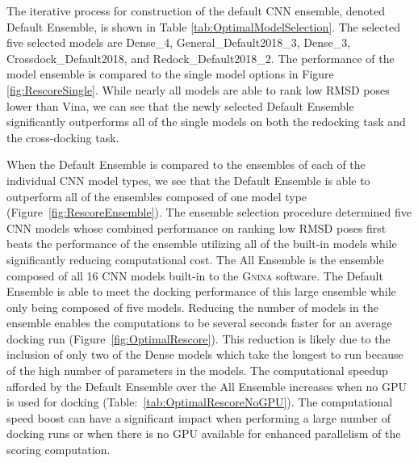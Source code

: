 \documentclass[journal=jcisd8,manuscript=article]{achemso}
\begin{document}
The iterative process for construction of the default CNN ensemble, denoted Default Ensemble, is shown in Table \ref{tab:OptimalModelSelection}. The selected five selected models are Dense\_4, General\_Default2018\_3, Dense\_3, Crossdock\_Default2018, and Redock\_Default2018\_2. The performance of the model ensemble is compared to the single model options in Figure \ref{fig:RescoreSingle}. While nearly all models are able to rank low RMSD poses lower than Vina, we can see that the newly selected Default Ensemble significantly outperforms all of the single models on both the redocking task and the cross-docking task.  

When the Default Ensemble is compared to the ensembles of each of the individual CNN model types, we see that the Default Ensemble is able to outperform all of the ensembles composed of one model type (Figure~\ref{fig:RescoreEnsemble}). The ensemble selection procedure determined five CNN models whose combined performance on ranking low RMSD poses first beats the performance of the ensemble utilizing all of the built-in models while significantly reducing computational cost. The All Ensemble is the ensemble composed of all 16 CNN models built-in to the \textsc{Gnina} software. The Default Ensemble is able to meet the docking performance of this large ensemble while only being composed of five models. Reducing the number of models in the ensemble enables the computations to be several seconds faster for an average docking run (Figure~\ref{fig:OptimalRescore}). This reduction is likely due to the inclusion of only two of the Dense models which take the longest to run because of the high number of parameters in the models. The computational speedup afforded by the Default Ensemble over the All Ensemble increases when no GPU is used for docking (Table:~\ref{tab:OptimalRescoreNoGPU}). The computational speed boost can have a significant impact when performing a large number of docking runs or when there is no GPU available for enhanced parallelism of the scoring computation.
\end{document}
